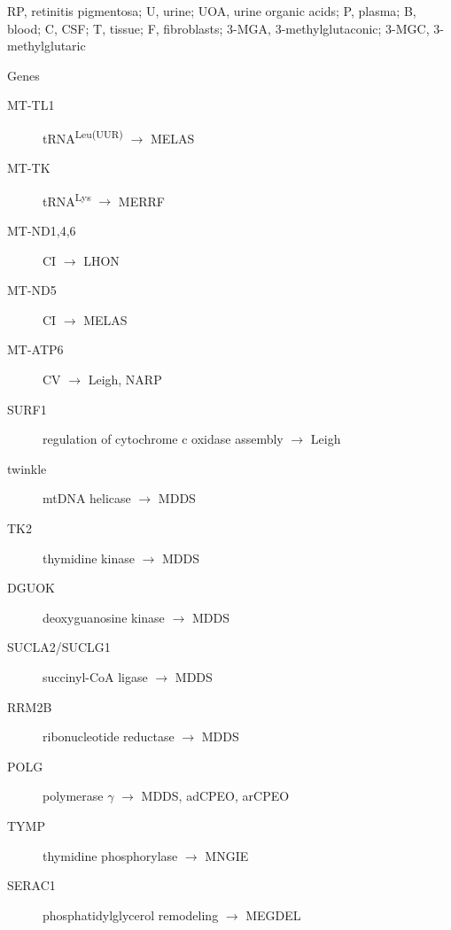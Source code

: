 \documentclass[landscape]{article}
\begin{document}
\begin{description}
\item[{Abbreviations}] RP, retinitis pigmentosa; U, urine; UOA, urine
organic acids; P, plasma; B, blood; C, CSF; T, tissue; F,
fibroblasts; 3-MGA, 3-methylglutaconic; 3-MGC, 3-methylglutaric

\item Genes
\begin{description}
\item[{MT-TL1}] tRNA\textsuperscript{Leu(UUR)} \(\to\) MELAS
\item[{MT-TK}] tRNA\textsuperscript{Lys} \(\to\) MERRF
\item[{MT-ND1,4,6}] CI \(\to\) LHON
\item[{MT-ND5}] CI \(\to\) MELAS
\item[{MT-ATP6}] CV \(\to\) Leigh, NARP
\item[{SURF1}] regulation of cytochrome c oxidase assembly \(\to\) Leigh
\item[{twinkle}] mtDNA helicase \(\to\) MDDS
\item[{TK2}] thymidine kinase \(\to\) MDDS
\item[{DGUOK}] deoxyguanosine kinase \(\to\) MDDS
\item[{SUCLA2/SUCLG1}] succinyl-CoA ligase  \(\to\) MDDS
\item[{RRM2B}] ribonucleotide reductase \(\to\) MDDS
\item[{POLG}] polymerase \(\gamma\) \(\to\) MDDS, adCPEO, arCPEO
\item[{TYMP}] thymidine phosphorylase \(\to\) MNGIE
\item[{SERAC1}] phosphatidylglycerol remodeling \(\to\) MEGDEL
\end{description}
\end{description}
\end{document}
